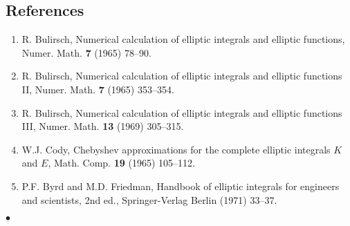\documentclass[]{article}
\begin{document}
\subsection{References}
\begin{enumerate}
\item R. Bulirsch, Numerical calculation of elliptic integrals and
elliptic functions, Numer. Math. \textbf{7} (1965) 78--90.
\item R. Bulirsch, Numerical calculation of elliptic integrals and
elliptic functions II, Numer. Math. \textbf{7} (1965) 353--354.
\item R. Bulirsch, Numerical calculation of elliptic integrals and
elliptic functions III, Numer. Math. \textbf{13} (1969) 305--315.
\item W.J. Cody, Chebyshev approximations for the complete elliptic
integrals $K$ and $E$, Math. Comp. \textbf{19} (1965) 105--112.
\item P.F. Byrd and M.D. Friedman, Handbook of elliptic integrals
for engineers and scientists, 2nd ed., Springer-Verlag Berlin (1971)
33--37.
\end{enumerate}
$\bullet$
\end{document}
